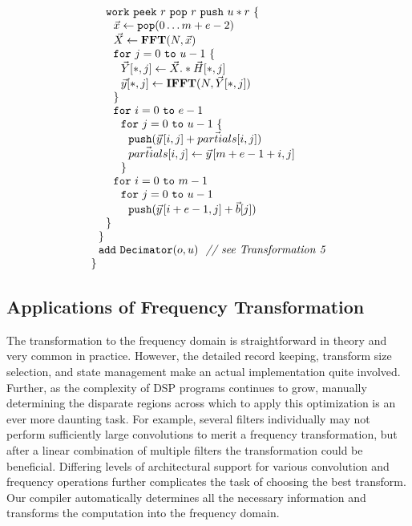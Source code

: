 \documentclass{sig-alternate}
\begin{document}
{\begin{transformation}
\begin{equation}
{\begin{array}{ll}
    \\
    ~~~~{\tt work}~{\tt peek}~r~{\tt pop}~r~{\tt push}~u*r~{\tt \{} \\
    ~~~~~~\vec{x} \leftarrow {\tt pop}(0 \dots m+e-2) \\
    ~~~~~~\vec{X} \leftarrow \mathbf{FFT} (N, \vec{x}) \\
    ~~~~~~{\tt for}~j=0~{\tt to}~u-1~{\tt \{}\\
    ~~~~~~~~\vec{Y}[*,j] \leftarrow \vec{X} .* \vec{H}[*,j] \\
    ~~~~~~~~\vec{y}[*,j] \leftarrow \mathbf{IFFT}(N, \vec{Y}[*,j]) \\
    ~~~~~~{\tt \}} \\
    ~~~~~~{\tt for}~i=0~{\tt to}~e-1\\
    ~~~~~~~~{\tt for}~j=0~{\tt to}~u-1~{\tt \{}\\
    ~~~~~~~~~~{\tt push}(\vec{y}\hspace{1pt}[i,j] + \vec{partials}[i,j])\\
    ~~~~~~~~~~\vec{partials}[i,j] \leftarrow \vec{y}\hspace{1pt}[m+e-1+i,j]\\
    ~~~~~~~~{\tt \}} \\
    ~~~~~~{\tt for}~i=0~{\tt to}~m-1\\
    ~~~~~~~~{\tt for}~j=0~{\tt to}~u-1\\
    ~~~~~~~~~~{\tt push}(\vec{y}\hspace{1pt}[i+e-1,j] + {\vec b}[j])\\
    ~~~~{\tt \}} \\
    ~~{\tt \}} \\
    ~~{\tt add~Decimator}(o, u)~~\mbox{\it // see Transformation 5}\\
    {\tt \}} \\
  \end{array}}
\end{equation}
\end{transformation}

\subsection{Applications of Frequency Transformation}

The transformation to the frequency domain is straightforward in
theory and very common in practice. However, the detailed record
keeping, transform size selection, and state management make an actual
implementation quite involved.  Further, as the complexity of DSP
programs continues to grow, manually determining the disparate regions
across which to apply this optimization is an ever more daunting task.
For example, several filters individually may not perform sufficiently
large convolutions to merit a frequency transformation, but after a
linear combination of multiple filters the transformation could be
beneficial.  Differing levels of architectural support for various
convolution and frequency operations further complicates the task of
choosing the best transform.  Our compiler automatically determines
all the necessary information and transforms the computation into the
frequency domain.

}
\end{document}
